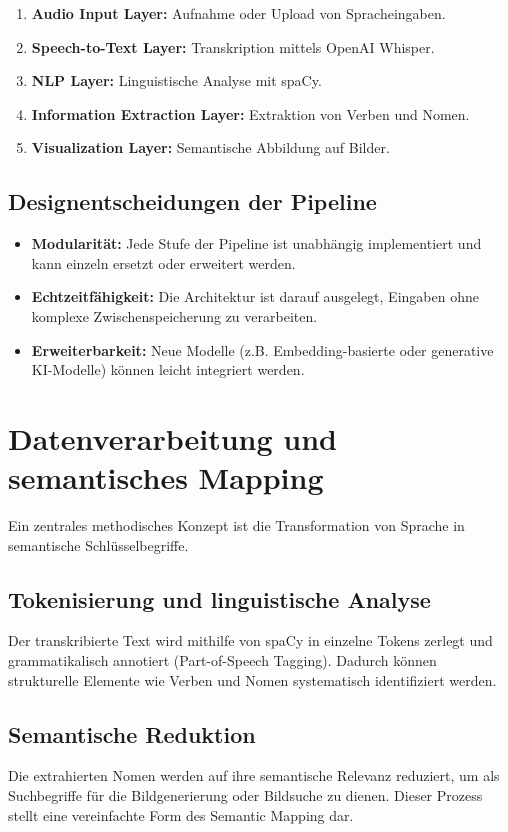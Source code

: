 \begin{enumerate}
    \item \textbf{Audio Input Layer:} Aufnahme oder Upload von Spracheingaben.
    \item \textbf{Speech-to-Text Layer:} Transkription mittels OpenAI Whisper.
    \item \textbf{NLP Layer:} Linguistische Analyse mit spaCy.
    \item \textbf{Information Extraction Layer:} Extraktion von Verben und Nomen.
    \item \textbf{Visualization Layer:} Semantische Abbildung auf Bilder.
\end{enumerate}

\subsection{Designentscheidungen der Pipeline}
\begin{itemize}
    \item \textbf{Modularität:} Jede Stufe der Pipeline ist unabhängig implementiert und kann einzeln ersetzt oder erweitert werden.
    \item \textbf{Echtzeitfähigkeit:} Die Architektur ist darauf ausgelegt, Eingaben ohne komplexe Zwischenspeicherung zu verarbeiten.
    \item \textbf{Erweiterbarkeit:} Neue Modelle (z.B. Embedding-basierte oder generative KI-Modelle) können leicht integriert werden.
\end{itemize}

\section{Datenverarbeitung und semantisches Mapping}
Ein zentrales methodisches Konzept ist die Transformation von Sprache in semantische Schlüsselbegriffe.

\subsection{Tokenisierung und linguistische Analyse}
Der transkribierte Text wird mithilfe von spaCy in einzelne Tokens zerlegt und grammatikalisch annotiert (Part-of-Speech Tagging). Dadurch können strukturelle Elemente wie Verben und Nomen systematisch identifiziert werden.

\subsection{Semantische Reduktion}
Die extrahierten Nomen werden auf ihre semantische Relevanz reduziert, um als Suchbegriffe für die Bildgenerierung oder Bildsuche zu dienen. Dieser Prozess stellt eine vereinfachte Form des Semantic Mapping dar.

